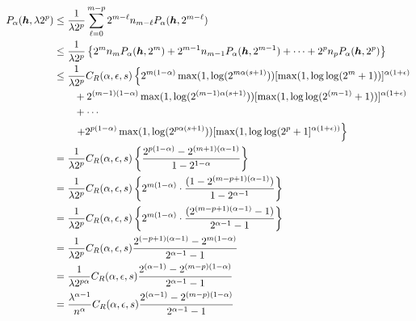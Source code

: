 \documentclass{amsart}
\begin{document}
\begin{align*}
    P_\alpha(\vh,\lambda 2^p)
    & \le \frac {1}{\lambda 2^p} \sum_{\ell = 0}^{m-p} 2^{m-\ell} n_{m -\ell} P_\alpha(\vh,2^{m-\ell}) \\
    & \le \frac {1}{\lambda 2^p} \left\{2^m n_m P_\alpha(\vh,2^m) + 2^{m-1} n_{m-1} P_\alpha(\vh,2^{m-1}) + \cdots + 2^p n_p P_\alpha(\vh,2^p) %
    \right\} \\ %
    & \le \frac {1}{\lambda 2^p} C_{R}(\alpha,\epsilon,s) \left\{ 2^{m(1-\alpha)}\max(1, \log(2^{m\alpha(s+1)})) [\max(1,\log \log (
    2^m+1))]^{\alpha(1+\epsilon)}\right .\\ 
    & \qquad  + 2^{(m-1)(1-\alpha)}\max(1, \log(2^{(m-1)\alpha(s+1)})) [\max(1,\log \log (
    2^{(m-1)}+1))]^{\alpha(1+\epsilon)}\\
      &  \qquad + \cdots \\
      & \qquad  \left . +  2^{p(1-\alpha)}\max(1,\log(2^{p\alpha(s+1)})) [\max(1,\log \log (2^p+1]^{\alpha(1+\epsilon))}  \right\}\\
    & = \frac {1}{\lambda 2^p} C_{R}(\alpha,\epsilon,s) 
    \left\{\frac{2^{p(1-\alpha)} - 2^{(m+1)(\alpha - 1)}}{1 - 2^{1 -\alpha}}\right\} \\
    & = \frac {1}{\lambda 2^p} C_{R}(\alpha,\epsilon,s) \left\{ 2^{m(1-\alpha)} \cdot \frac{(1 - 2^{(m-p+1)(\alpha - 1)})}{1 - 2^{\alpha-1}}\right\} \\
    & = \frac {1}{\lambda 2^p} C_{R}(\alpha,\epsilon,s) \left\{ 2^{m(1-\alpha)} \cdot \frac{(2^{(m-p+1)(\alpha - 1)}-1)}{2^{\alpha-1}-1}\right\} \\
    & = \frac {1}{\lambda 2^p} C_{R}(\alpha,\epsilon,s) \frac{2^{(-p+1)(\alpha -1)} - 2^{m(1-\alpha)}} {2^{\alpha-1}-1}\\
    & = \frac {1}{\lambda 2^{p\alpha}} C_{R}(\alpha,\epsilon,s) \frac{2^{(\alpha -1)} - 2^{(m-p)(1-\alpha)}} {2^{\alpha-1}-1}\\
    & = \frac {\lambda^{\alpha-1}}{n^{\alpha}} C_{R}(\alpha,\epsilon,s) \frac{2^{(\alpha -1)} - 2^{(m-p)(1-\alpha)}} {2^{\alpha-1}-1}\\
\end{align*}




\end{document}
